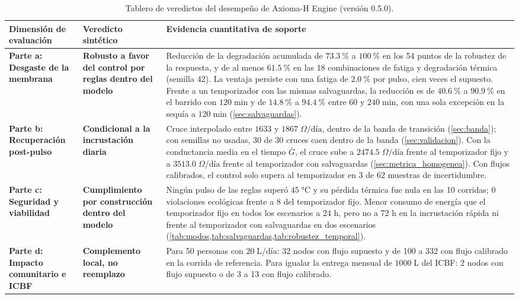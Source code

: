 \begin{table}[htbp]
\centering
\small
\caption{Tablero de veredictos del desempe\~no de Axioma-H Engine (versi\'on 0.5.0).}
\label{tab:veredictos}
\begin{tabularx}{\textwidth}{@{}L{3.2cm}L{3.5cm}Y@{}}
\toprule
\textbf{Dimensi\'on de evaluaci\'on} & \textbf{Veredicto sint\'etico} & \textbf{Evidencia cuantitativa de soporte} \\
\midrule
\textbf{Parte a: Desgaste de la membrana} & \textbf{Robusto a favor del control por reglas dentro del modelo} & Reducci\'on de la degradaci\'on acumulada de $\SI{73.3}{\percent}$ a $\SI{100}{\percent}$ en los 54 puntos de la robustez de la respuesta, y de al menos $\SI{61.5}{\percent}$ en las 18 combinaciones de fatiga y degradaci\'on t\'ermica (semilla 42). La ventaja persiste con una fatiga de $\SI{2.0}{\percent}$ por pulso, cien veces el supuesto. Frente a un temporizador con las mismas salvaguardas, la reducci\'on es de $\SI{40.6}{\percent}$ a $\SI{90.9}{\percent}$ en el barrido con $120\;\text{min}$ y de $\SI{14.8}{\percent}$ a $\SI{94.4}{\percent}$ entre 60 y $240\;\text{min}$, con una sola excepci\'on en la sequ\'ia a $120\;\text{min}$ (\cref{sec:salvaguardas}). \\
\midrule
\textbf{Parte b: Recuperaci\'on post-pulso} & \textbf{Condicional a la incrustaci\'on diaria} & Cruce interpolado entre $1633$ y $1867\;\Omega\text{/d\'ia}$, dentro de la banda de transici\'on (\cref{sec:banda}); con semillas no usadas, 30 de 30 cruces caen dentro de la banda (\cref{sec:validacion}). Con la conductancia media en el tiempo $\bar{G}$, el cruce sube a $2474.5\;\Omega\text{/d\'ia}$ frente al temporizador fijo y a $3513.0\;\Omega\text{/d\'ia}$ frente al temporizador con salvaguardas (\cref{sec:metrica_homogenea}). Con flujos calibrados, el control solo supera al temporizador en 3 de 62 muestras de incertidumbre. \\
\midrule
\textbf{Parte c: Seguridad y viabilidad} & \textbf{Cumplimiento por construcci\'on dentro del modelo} & Ning\'un pulso de las reglas super\'o $45\;\si{\celsius}$ y su p\'erdida t\'ermica fue nula en las 10 corridas; 0 violaciones ecol\'ogicas frente a 8 del temporizador fijo. Menor consumo de energ\'ia que el temporizador fijo en todos los escenarios a 24 h, pero no a 72 h en la incrustaci\'on r\'apida ni frente al temporizador con salvaguardas en dos escenarios (\cref{tab:modos,tab:salvaguardas,tab:robustez_temporal}). \\
\midrule
\textbf{Parte d: Impacto comunitario e ICBF} & \textbf{Complemento local, no reemplazo} & Para 50 personas con $20\;\text{L/d\'ia}$: 32 nodos con flujo supuesto y de 100 a 332 con flujo calibrado en la corrida de referencia. Para igualar la entrega mensual de $1000\;\text{L}$ del ICBF: 2 nodos con flujo supuesto o de 3 a 13 con flujo calibrado. \\
\bottomrule
\end{tabularx}
\end{table}

